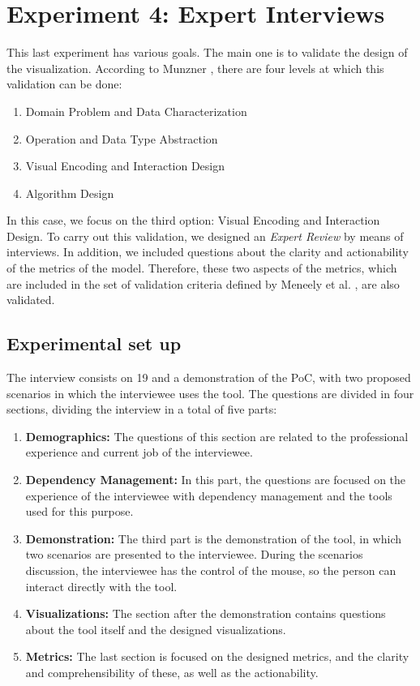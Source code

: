 \section{Experiment 4: Expert Interviews}
This last experiment has various goals. The main one is to validate the design of the visualization. According to Munzner \cite{Munzner2009}, there are four levels at which this validation can be done:

\begin{enumerate}
  \item Domain Problem and Data Characterization
  \item Operation and Data Type Abstraction
  \item Visual Encoding and Interaction Design
  \item Algorithm Design
\end{enumerate}

In this case, we focus on the third option: Visual Encoding and Interaction Design. To carry out this validation, we designed an \textit{Expert Review} by means of interviews. In addition, we included questions about the clarity and actionability of the metrics of the model. Therefore, these two aspects of the metrics, which are included in the set of validation criteria defined by Meneely et al. \cite{Meneely2012}, are also validated.

\subsection{Experimental set up}
The interview consists on 19 and a demonstration of the PoC, with two proposed scenarios in which the interviewee uses the tool. The questions are divided in four sections, dividing the interview in a total of five parts:

\begin{enumerate}
  \item \textbf{Demographics:} The questions of this section are related to the professional experience and current job of the interviewee.
  \item \textbf{Dependency Management:} In this part, the questions are focused on the experience of the interviewee with dependency management and the tools used for this purpose.
  \item \textbf{Demonstration:} The third part is the demonstration of the tool, in which two scenarios are presented to the interviewee. During the scenarios discussion, the interviewee has the control of the mouse, so the person can interact directly with the tool.
  \item \textbf{Visualizations:} The section after the demonstration contains questions about the tool itself and the designed visualizations.
  \item \textbf{Metrics:} The last section is focused on the designed metrics, and the clarity and comprehensibility of these, as well as the actionability.
\end{enumerate}

